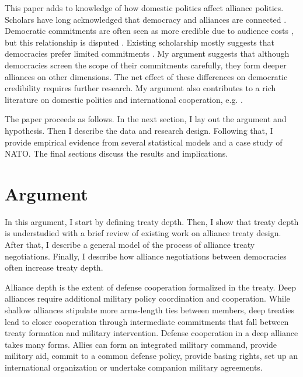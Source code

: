 \documentclass[12pt]{article}
\begin{document}
This paper adds to knowledge of how domestic politics affect alliance politics. 
Scholars have long acknowledged that democracy and alliances are connected \citep{LaiReiter2000, GiblerWolford2006, Warren2016, McManusYarhi-Milo2017}. 
Democratic commitments are often seen as more credible due to audience costs \citep{Gaubatz1996, DigiuseppePoast2016}, but this relationship is disputed \citep{GartzkeGleditsch2004}. 
Existing scholarship mostly suggests that democracies prefer limited commitments \citep{Mattes2012, Chibaetal2015}. 
My argument suggests that although democracies screen the scope of their commitments carefully, they form deeper alliances on other dimensions.  
The net effect of these differences on democratic credibility requires further research. 
My argument also contributes to a rich literature on domestic politics and international cooperation, e.g. \citep{DownesRocke1995, Fearon1998, Leeds1999, MattesRodriguez2014}. 


The paper proceeds as follows. 
In the next section, I lay out the argument and hypothesis. 
Then I describe the data and research design. 
Following that, I provide empirical evidence from several statistical models and a case study of NATO. 
The final sections discuss the results and implications. 


\section{Argument}


In this argument, I start by defining treaty depth. 
Then, I show that treaty depth is understudied with a brief review of existing work on alliance treaty design. 
After that, I describe a general model of the process of alliance treaty negotiations. 
Finally, I describe how alliance negotiations between democracies often increase treaty depth. 


Alliance depth is the extent of defense cooperation formalized in the treaty. 
Deep alliances require additional military policy coordination and cooperation. 
While shallow alliances stipulate more arms-length ties between members, deep treaties lead to closer cooperation through intermediate commitments that fall between treaty formation and military intervention. 
Defense cooperation in a deep alliance takes many forms. 
Allies can form an integrated military command, provide military aid, commit to a common defense policy, provide basing rights, set up an international organization or undertake companion military agreements. 
\end{document}
